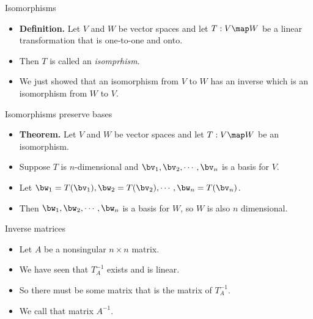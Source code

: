 \documentclass{beamer}
\begin{document}

\begin{frame}{Isomorphisms}

\begin{itemize}
\item \textbf{Definition.} Let $V$ and $W$ be vector spaces and let
$T:V\map W$ be a linear transformation that is one-to-one and onto.
\item Then $T$ is called an \emph{isomprhism}.
\item We just showed that an isomorphism from $V$ to $W$ has an inverse
which is an isomorphism from $W$ to $V$.
\end{itemize}
\end{frame}
\begin{frame}{Isomorphisms preserve bases}

\begin{itemize}
\item \textbf{Theorem.} Let $V$ and $W$ be vector spaces and let
$T:V\map W$ be an isomorphism.
\item Suppose $T$ is $n$-dimensional and $\bv_1,\bv_2,\cdots,\bv_n$
is a basis for $V$.
\item Let $\bw_1=T(\bv_1),\bw_2=T(\bv_2),\cdots,\bw_n=T(\bv_n)$.
\item Then $\bw_1,\bw_2,\cdots,\bw_n$ is a basis for $W$, so $W$ is also
$n$ dimensional.
\end{itemize}
\end{frame}

\begin{frame}{Inverse matrices}

\begin{itemize}
\item Let $A$ be a nonsingular $n\times n$ matrix.
\item We have seen that $T_A^{-1}$ exists and is linear.
\item So there must be some matrix that is the matrix of $T_A^{-1}$.
\item We call that matrix $A^{-1}$.
\end{itemize}
\end{frame}
\end{document}
